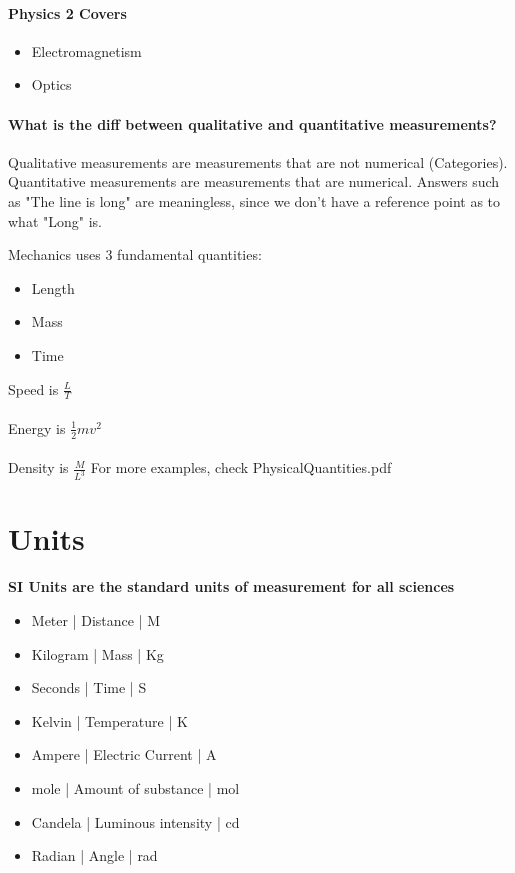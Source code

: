 \documentclass[]{article}
\begin{document}
\paragraph*{Physics 2 Covers}
\begin{itemize}
\item Electromagnetism
\item Optics
\end{itemize}

\paragraph*{What is the diff between qualitative and quantitative measurements?} Qualitative measurements are measurements that are not numerical (Categories). Quantitative measurements are measurements that are numerical.
Answers such as "The line is long" are meaningless, since we don't have a reference point as to what "Long" is.

Mechanics uses 3 fundamental quantities:
\begin{itemize}
    \item Length
    \item Mass
    \item Time
\end{itemize}
Speed is $\frac{L}{T}$
\\
\\
Energy is $\frac{1}{2}mv^2$
\\
\\
Density is $\frac{M}{L^3}$
For more examples, check PhysicalQuantities.pdf

\section*{Units}
\textbf{SI Units are the standard units of measurement for all sciences}
\begin{itemize}
        \item Meter | Distance | M
        \item Kilogram | Mass | Kg
        \item Seconds | Time | S
        \item Kelvin | Temperature | K
        \item Ampere | Electric Current | A
        \item mole | Amount of substance | mol
        \item Candela | Luminous intensity | cd
        \item Radian | Angle | rad 
\end{itemize}
\end{document}
